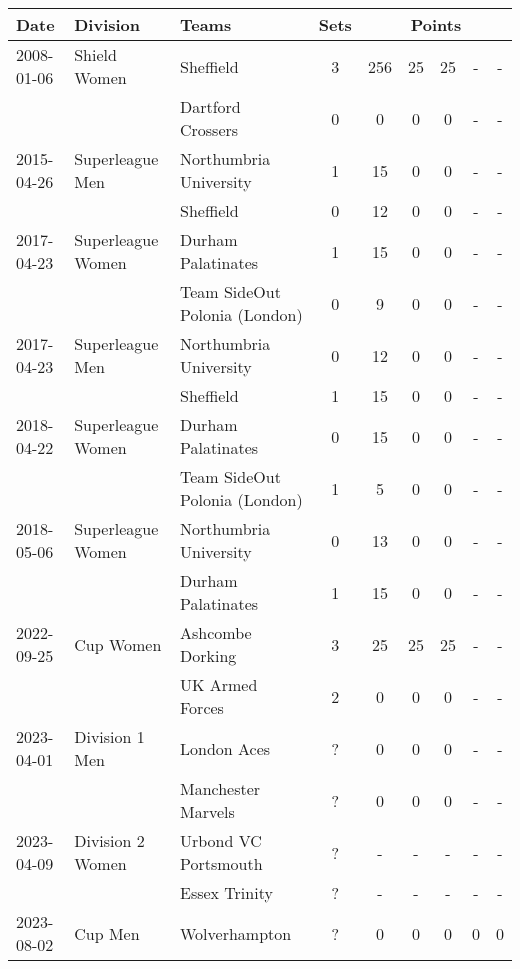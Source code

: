	\begin{table}
		\centering
		\begin{tabular}{|l|l|l|c|ccccc|}
			\hline
			\rowcolor{Goldenrod}%
			\textbf{Date} & \textbf{Division} & \textbf{Teams} & \textbf{Sets} & \multicolumn{5}{c|}{\textbf{Points}}\\	\hline
			2008-01-06 & Shield Women & Sheffield & 3 & 256 & 25 & 25 & - & - \\
			&      & Dartford Crossers & 0 & 0   & 0  & 0  & - & - \\
			\hline
			2015-04-26 & Superleague Men & Northumbria University & 1 & 15 & 0 & 0 & - & - \\
			&                 & Sheffield              & 0 & 12 & 0 & 0 & - & - \\
			\hline
			2017-04-23 & Superleague Women & Durham Palatinates & 1 & 15 & 0 & 0 & - & - \\
			&        & Team SideOut Polonia (London) & 0 & 9  & 0 & 0 & - & - \\
			\hline
			2017-04-23 & Superleague Men & Northumbria University & 0 & 12 & 0 & 0 & - & - \\
			&                 & Sheffield              & 1 & 15 & 0 & 0 & - & - \\
			\hline
			2018-04-22 & Superleague Women & Durham Palatinates & 0 & 15 & 0 & 0 & - & - \\
			&        & Team SideOut Polonia (London) & 1 & 5  & 0 & 0 & - & - \\
			\hline
			2018-05-06 & Superleague Women & Northumbria University & 0 & 13 & 0 & 0 & - & - \\
			&                   & Durham Palatinates     & 1 & 15 & 0 & 0 & - & - \\
			\hline
			2022-09-25 & Cup Women & Ashcombe Dorking & 3 & 25 & 25 & 25 & - & - \\
			&           & UK Armed Forces  & 2 & 0  & 0  & 0  & - & - \\
			\hline
			2023-04-01 & Division 1 Men & London Aces & ? & 0 & 0 & 0 & - & - \\
			&        & Manchester Marvels  & ? & 0 & 0 & 0 & - & - \\
			\hline
			2023-04-09 & Division 2 Women & Urbond VC Portsmouth & ? & - & - & - & - & - \\
			&                  & Essex Trinity        & ? & - & - & - & - & - \\
			\hline
			2023-08-02 & Cup Men & Wolverhampton & ? & 0 & 0 & 0 & 0 & 0 \\

\end{tabular}
\end{table}
